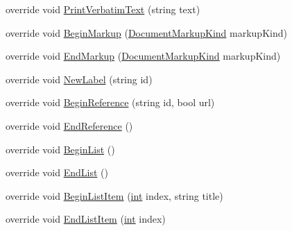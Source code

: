 \begin{DoxyCompactItemize}
override void \hyperlink{class_software_engineering_tools_1_1_documentation_1_1_h_t_m_l_generator_ab70274fa5dcb13c561b34ac2f1408232}{Print\+Verbatim\+Text} (string text)
\item 
override void \hyperlink{class_software_engineering_tools_1_1_documentation_1_1_h_t_m_l_generator_abf50ab24cd3a1112940a09542c1cb787}{Begin\+Markup} (\hyperlink{namespace_software_engineering_tools_1_1_documentation_a4eed17ca0ed06a8b62b953b063f857d9}{Document\+Markup\+Kind} markup\+Kind)
\item 
override void \hyperlink{class_software_engineering_tools_1_1_documentation_1_1_h_t_m_l_generator_a8d9e908b055e1a844b8681542087760a}{End\+Markup} (\hyperlink{namespace_software_engineering_tools_1_1_documentation_a4eed17ca0ed06a8b62b953b063f857d9}{Document\+Markup\+Kind} markup\+Kind)
\item 
override void \hyperlink{class_software_engineering_tools_1_1_documentation_1_1_h_t_m_l_generator_a6bd052d1eeb8495f8eec86dd98e06186}{New\+Label} (string id)
\item 
override void \hyperlink{class_software_engineering_tools_1_1_documentation_1_1_h_t_m_l_generator_ae6cd34a01a45c94485bc4d50d7e065b7}{Begin\+Reference} (string id, bool url)
\item 
override void \hyperlink{class_software_engineering_tools_1_1_documentation_1_1_h_t_m_l_generator_a7596befae40e133150f8acf40ee6863b}{End\+Reference} ()
\item 
override void \hyperlink{class_software_engineering_tools_1_1_documentation_1_1_h_t_m_l_generator_a18d52185703fa6da3727b26297917383}{Begin\+List} ()
\item 
override void \hyperlink{class_software_engineering_tools_1_1_documentation_1_1_h_t_m_l_generator_a65fa0e91f8157b674d922dd5800d14d0}{End\+List} ()
\item 
override void \hyperlink{class_software_engineering_tools_1_1_documentation_1_1_h_t_m_l_generator_a4da5442652b4dcd06bd011f43cd0c6ea}{Begin\+List\+Item} (\hyperlink{namespace_software_engineering_tools_1_1_documentation_a4a8017aa254d1d05b03db5132b7dd3a7afa7153f7ed1cb6c0fcf2ffb2fac21748}{int} index, string title)
\item 
override void \hyperlink{class_software_engineering_tools_1_1_documentation_1_1_h_t_m_l_generator_a241deff51afd30112c7cfe061f7fb328}{End\+List\+Item} (\hyperlink{namespace_software_engineering_tools_1_1_documentation_a4a8017aa254d1d05b03db5132b7dd3a7afa7153f7ed1cb6c0fcf2ffb2fac21748}{int} index)
\item 

\end{DoxyCompactItemize}
